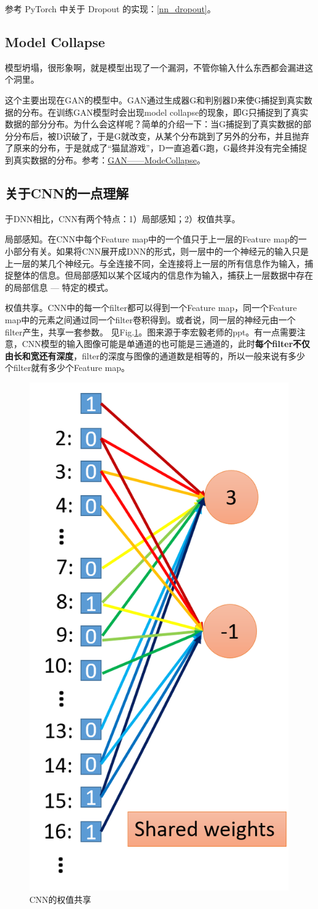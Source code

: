 参考 PyTorch 中关于 Dropout 的实现：\ref{nn_dropout}。

\subsection{Model Collapse}
模型坍塌，很形象啊，就是模型出现了一个漏洞，不管你输入什么东西都会漏进这个洞里。

这个主要出现在GAN的模型中。GAN通过生成器G和判别器D来使G捕捉到真实数据的分布。在训练GAN模型时会出现model collapse的现象，即G只捕捉到了真实数据的部分分布。为什么会这样呢？简单的介绍一下：当G捕捉到了真实数据的部分分布后，被D识破了，于是G就改变，从某个分布跳到了另外的分布，并且抛弃了原来的分布，于是就成了“猫鼠游戏”，D一直追着G跑，G最终并没有完全捕捉到真实数据的分布。参考：\href{https://blog.csdn.net/SPARKKKK/article/details/72598041}{GAN——ModeCollapse}。


\subsection{关于CNN的一点理解}
于DNN相比，CNN有两个特点：1）局部感知；2）权值共享。

局部感知。在CNN中每个Feature map中的一个值只于上一层的Feature map的一小部分有关。如果将CNN展开成DNN的形式，则一层中的一个神经元的输入只是上一层的某几个神经元。与全连接不同，全连接将上一层的所有信息作为输入，捕捉整体的信息。但局部感知以某个区域内的信息作为输入，捕获上一层数据中存在的局部信息 --- 特定的模式。

权值共享。CNN中的每一个filter都可以得到一个Feature map，同一个Feature map中的元素之间通过同一个filter卷积得到。或者说，同一层的神经元由一个filter产生，共享一套参数。
见Fig.\ref{fig:share_weight}。图来源于李宏毅老师的ppt。有一点需要注意，CNN模型的输入图像可能是单通道的也可能是三通道的，此时\textbf{每个filter不仅由长和宽还有深度}，filter的深度与图像的通道数是相等的，所以一般来说有多少个filter就有多少个Feature map。

\begin{figure}[h]
	\centering
	\includegraphics[width=.3\textwidth]{pics/share_weight.png}
	\caption{CNN的权值共享}
	\label{fig:share_weight}
\end{figure}

